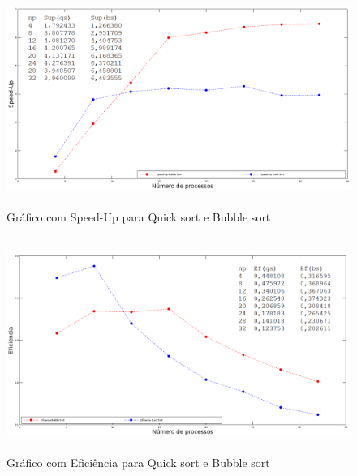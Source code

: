 \documentclass{article}
\begin{document}
\begin{figure}[H]
            \centering
            \vspace{-0.3em}
            \includegraphics[width=14cm, height=7cm]{speedup_vals.png}
            \vspace{-0.6em}
            \caption{Gráfico com Speed-Up para Quick sort e Bubble sort}
            \vspace{-1.1em}
\end{figure}

\begin{figure}[H]
            \centering
            \vspace{-0.3em}
            \includegraphics[width=14cm, height=7cm]{eficiencia_vals.png}
            \vspace{-0.6em}
            \caption{Gráfico com Eficiência para Quick sort e Bubble sort}
            \vspace{-1.1em}
\end{figure}

\newpage



\newpage


\end{document}

